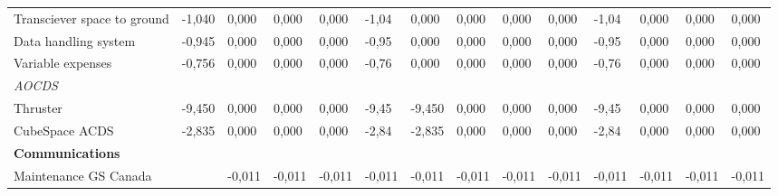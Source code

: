 \begin{landscape}
\begin{table}[]
{\begin{tabular}{|l|l|l|l|l|l|l|l|l|l|l|l|l|l|}
Transciever space to ground                                                            & -1,040           & 0,000           & 0,000           & 0,000           & -1,04           & 0,000           & 0,000           & 0,000           & 0,000           & -1,04           & 0,000            & 0,000            & 0,000            \\
Data handling system                                                                   & -0,945           & 0,000           & 0,000           & 0,000           & -0,95           & 0,000           & 0,000           & 0,000           & 0,000           & -0,95           & 0,000            & 0,000            & 0,000            \\
Variable expenses                                                                      & -0,756           & 0,000           & 0,000           & 0,000           & -0,76           & 0,000           & 0,000           & 0,000           & 0,000           & -0,76           & 0,000            & 0,000            & 0,000            \\
\textit{AOCDS}                                                                         &                  &                 &                 &                 &                 &                 &                 &                 &                 &                 &                  &                  &                  \\
Thruster                                                                               & -9,450           & 0,000           & 0,000           & 0,000           & -9,45           & -9,450          & 0,000           & 0,000           & 0,000           & -9,45           & 0,000            & 0,000            & 0,000            \\
CubeSpace ACDS                                                                         & -2,835           & 0,000           & 0,000           & 0,000           & -2,84           & -2,835          & 0,000           & 0,000           & 0,000           & -2,84           & 0,000            & 0,000            & 0,000            \\
\textbf{Communications}                                                                &                  &                 &                 &                 &                 &                 &                 &                 &                 &                 &                  &                  &                  \\
Maintenance GS Canada                                                                  &                  & -0,011          & -0,011          & -0,011          & -0,011          & -0,011          & -0,011          & -0,011          & -0,011          & -0,011          & -0,011           & -0,011           & -0,011           \\

\end{tabular}}
\end{table}
\end{landscape}
